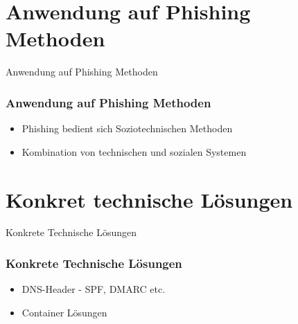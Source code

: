 \documentclass{beamer}
\begin{document}
\section{Anwendung auf Phishing Methoden}
\begin{frame}{Anwendung auf Phishing Methoden}
 \frametitle{Anwendung auf Phishing Methoden}
 
 \begin{itemize}
  \item Phishing bedient sich Soziotechnischen Methoden
  \item Kombination von technischen und sozialen Systemen
 \end{itemize}

\end{frame}
\section{Konkret technische Lösungen}
\begin{frame}{Konkrete Technische Lösungen}
 \frametitle{Konkrete Technische Lösungen}
 \begin{itemize}
  \item DNS-Header - SPF, DMARC etc.
  \item Container Lösungen
 \end{itemize}

\end{frame}
\end{document}
